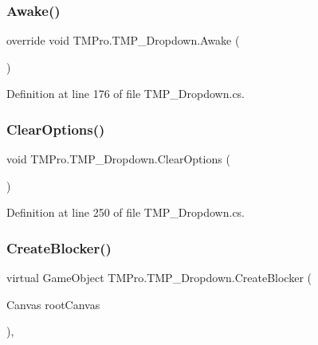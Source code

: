 \subsubsection{\texorpdfstring{Awake()}{Awake()}}
{\footnotesize\ttfamily override void T\+M\+Pro.\+T\+M\+P\+\_\+\+Dropdown.\+Awake (\begin{DoxyParamCaption}{ }\end{DoxyParamCaption})\hspace{0.3cm}{\ttfamily [protected]}}



Definition at line 176 of file T\+M\+P\+\_\+\+Dropdown.\+cs.

\mbox{\label{class_t_m_pro_1_1_t_m_p___dropdown_a031c8b8c5711c7fdb8a64bad0d139a0d}} 
\subsubsection{\texorpdfstring{ClearOptions()}{ClearOptions()}}
{\footnotesize\ttfamily void T\+M\+Pro.\+T\+M\+P\+\_\+\+Dropdown.\+Clear\+Options (\begin{DoxyParamCaption}{ }\end{DoxyParamCaption})}



Definition at line 250 of file T\+M\+P\+\_\+\+Dropdown.\+cs.

\mbox{\label{class_t_m_pro_1_1_t_m_p___dropdown_aaaca2aca289284551cb768b4de31123d}} 
\subsubsection{\texorpdfstring{CreateBlocker()}{CreateBlocker()}}
{\footnotesize\ttfamily virtual Game\+Object T\+M\+Pro.\+T\+M\+P\+\_\+\+Dropdown.\+Create\+Blocker (\begin{DoxyParamCaption}\item[{Canvas}]{root\+Canvas }\end{DoxyParamCaption})\hspace{0.3cm}{\ttfamily [protected]}, {\ttfamily [virtual]}}



